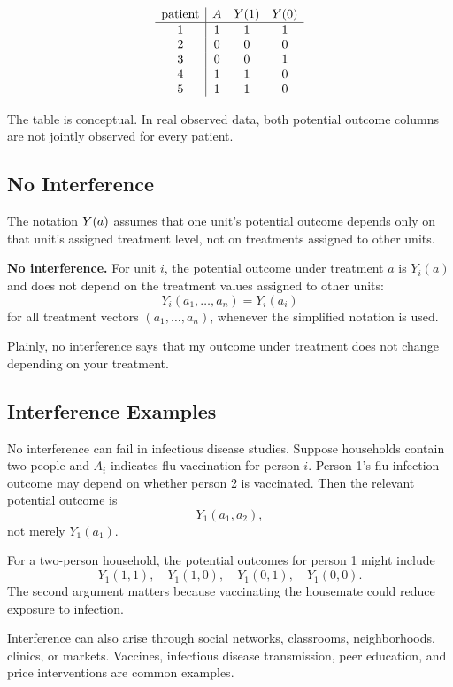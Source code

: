 \[
\begin{array}{c|ccc}
\text{patient} & A & Y(1) & Y(0)\\
\hline
1 & 1 & 1 & 1\\
2 & 0 & 0 & 0\\
3 & 0 & 0 & 1\\
4 & 1 & 1 & 0\\
5 & 1 & 1 & 0
\end{array}
\]

The table is conceptual. In real observed data, both potential outcome columns are not jointly observed for every patient.

\subsection{No Interference}

The notation $Y(a)$ assumes that one unit's potential outcome depends only on that unit's assigned treatment level, not on treatments assigned to other units.

\begin{assumptionbox}
\textbf{No interference.} For unit $i$, the potential outcome under treatment $a$ is $Y_i(a)$ and does not depend on the treatment values assigned to other units:
\[
Y_i(a_1,\ldots,a_n)=Y_i(a_i)
\]
for all treatment vectors $(a_1,\ldots,a_n)$, whenever the simplified notation is used.
\end{assumptionbox}

Plainly, no interference says that my outcome under treatment does not change depending on your treatment.

\subsection{Interference Examples}

No interference can fail in infectious disease studies. Suppose households contain two people and $A_i$ indicates flu vaccination for person $i$. Person 1's flu infection outcome may depend on whether person 2 is vaccinated. Then the relevant potential outcome is
\[
Y_1(a_1,a_2),
\]
not merely $Y_1(a_1)$.

For a two-person household, the potential outcomes for person 1 might include
\[
Y_1(1,1),\quad Y_1(1,0),\quad Y_1(0,1),\quad Y_1(0,0).
\]
The second argument matters because vaccinating the housemate could reduce exposure to infection.

Interference can also arise through social networks, classrooms, neighborhoods, clinics, or markets. Vaccines, infectious disease transmission, peer education, and price interventions are common examples.

